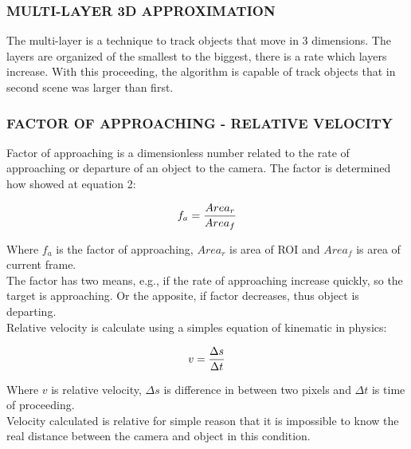 \subsubsection{MULTI-LAYER 3D APPROXIMATION}
The multi-layer is a technique to track objects that move in 3 dimensions. The layers are organized of the smallest to the biggest, 
there is a rate which layers increase. With this proceeding, the algorithm is capable of track objects that in second scene was larger than first.\\


\subsubsection{FACTOR OF APPROACHING - RELATIVE VELOCITY}
Factor of approaching is a dimensionless number related to the rate of approaching or departure of an object to the camera. The factor
is determined how showed at equation 2:

\begin{equation}
\centering
\everymath{\displaystyle}
f_a = \frac{Area_r}{Area_f} 
\end{equation}

Where $f_a$ is the factor of approaching, $Area_r$ is area of ROI and $Area_f$ is area of current frame.\\
The factor has two means, e.g., if the rate of approaching increase quickly, so the target is approaching. Or the apposite, if factor decreases, thus 
object is departing.\\
Relative velocity is calculate using a simples equation of kinematic in physics:


\begin{equation}
\centering
\everymath{\displaystyle}
 v = \frac{\Delta s}{\Delta t}
\end{equation}

Where $v$ is relative velocity, $\Delta s$ is difference in between two pixels and $\Delta t$ is time of proceeding.\\
Velocity calculated is relative for simple reason that it is impossible to know the real distance between the camera and object in this
condition.\\
